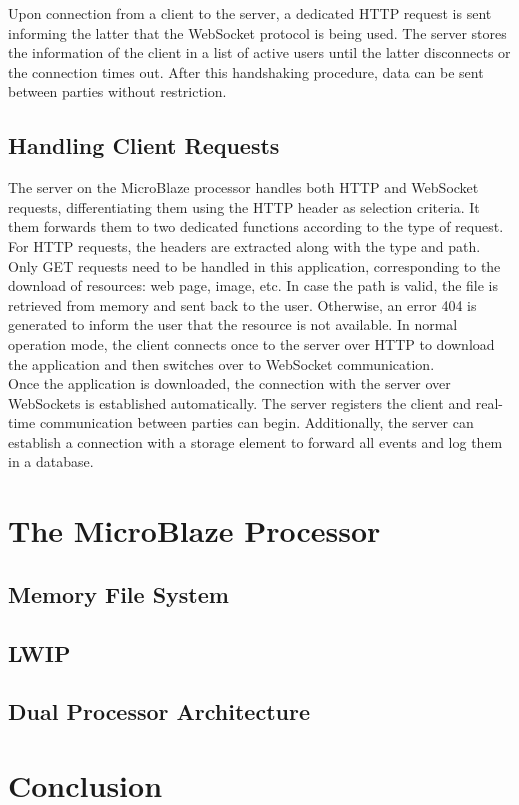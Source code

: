       Upon connection from a client to the server, a dedicated HTTP request is sent informing the latter that the WebSocket protocol is being used. The server stores the information of the client in a list of active users until the latter disconnects or the connection times out. After this handshaking procedure, data can be sent between parties without restriction.

    \subsection{Handling Client Requests}

      The server on the MicroBlaze processor handles both HTTP and WebSocket requests, differentiating them using the HTTP header as selection criteria. It them forwards them to two dedicated functions according to the type of request. \\

      For HTTP requests, the headers are extracted along with the type and path. Only GET requests need to be handled in this application, corresponding to the download of resources: web page, image, etc. In case the path is valid, the file is retrieved from memory and sent back to the user. Otherwise, an error 404 is generated to inform the user that the resource is not available. In normal operation mode, the client connects once to the server over HTTP to download the application and then switches over to WebSocket communication. \\

      Once the application is downloaded, the connection with the server over WebSockets is established automatically. The server registers the client and real-time communication between parties can begin. Additionally, the server can establish a connection with a storage element to forward all events and log them in a database.

  \section{The MicroBlaze Processor}

    

    \subsection{Memory File System}

    \subsection{LWIP}

    \subsection{Dual Processor Architecture}

  \section{Conclusion}

